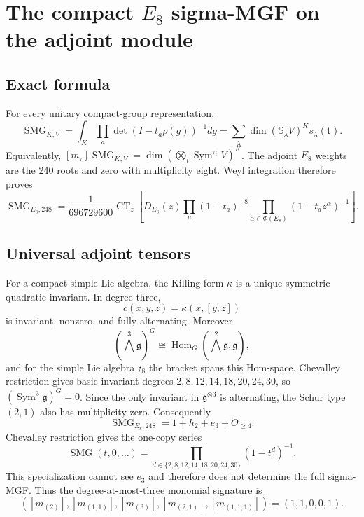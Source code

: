 \documentclass[10pt]{article}
\newcommand{\CT}{\operatorname{CT}}
\newcommand{\SMG}{\operatorname{SMG}}
\begin{document}
\clearpage
\section[The compact E8 sigma-MGF on the adjoint module]{The compact $E_8$ sigma-MGF on the adjoint module}\label{proof:e8}
\begingroup
{}
\providecommand{\Sg}{\SMG}
\renewcommand{\Sg}{\SMG}
\providecommand{\CT}{\operatorname{CT}}
\renewcommand{\CT}{\operatorname{CT}}
\setcounter{theorem}{0}
\setcounter{proposition}{0}
\setcounter{lemma}{0}
\setcounter{corollary}{0}
\setcounter{remark}{0}
\begin{abstract}
We prove the exact constant-term formula for the 248-dimensional adjoint
module, verify its root and zero-weight data and its quadratic invariant
exactly, and prove the alternating cubic row algebraically.  We also
record the correct one-copy Chevalley series and explain why it does not
determine the multivariate sigma-MGF.
\end{abstract}

\subsection{Exact formula}
For every unitary compact-group representation,
\[
 \Sg_{K,V}=\int_K\prod_a\det(I-t_a\rho(g))^{-1}dg
 =\sum_\lambda\dim(\mathbb S_\lambda V)^K s_\lambda(\mathbf t).
\]
Equivalently,
$[m_\tau]\Sg_{K,V}=\dim(\bigotimes_i\operatorname{Sym}^{\tau_i}V)^K$.
The adjoint $E_8$ weights are the 240 roots and zero with multiplicity eight.
Weyl integration therefore proves
\[
 \boxed{\Sg_{E_8,248}=\frac1{696729600}\CT_z\left[D_{E_8}(z)
 \prod_a(1-t_a)^{-8}\prod_{\alpha\in\Phi(E_8)}
 (1-t_a z^\alpha)^{-1}\right].}
\]

\subsection{Universal adjoint tensors}
For a compact simple Lie algebra, the Killing form $\kappa$ is a unique
symmetric quadratic invariant.  In degree three,
\[
 c(x,y,z)=\kappa(x,[y,z])
\]
is invariant, nonzero, and fully alternating.  Moreover
\[
(\bigwedge^3\mathfrak g)^G\cong
\operatorname{Hom}_G(\bigwedge^2\mathfrak g,\mathfrak g),
\]
and for the simple Lie algebra $\mathfrak e_8$ the bracket spans this
Hom-space.  Chevalley restriction gives basic invariant degrees
$2,8,12,14,18,20,24,30$, so $(\operatorname{Sym}^3\mathfrak g)^G=0$.
Since the only invariant in $\mathfrak g^{\otimes3}$ is alternating, the
Schur type $(2,1)$ also has multiplicity zero.  Consequently
\[
 \boxed{\Sg_{E_8,248}=1+h_2+e_3+O_{\ge4}.}
\]
Chevalley restriction gives the one-copy series
\[
 \boxed{\Sg(t,0,\ldots)=\prod_{d\in\{2,8,12,14,18,20,24,30\}}
 (1-t^d)^{-1}.}
\]
This specialization cannot see $e_3$ and therefore does not determine the
full sigma-MGF.
Thus the degree-at-most-three monomial signature is
\[
([m_{(2)}],[m_{(1,1)}],[m_{(3)}],[m_{(2,1)}],[m_{(1,1,1)}])
=(1,1,0,0,1).
\]
\end{document}
